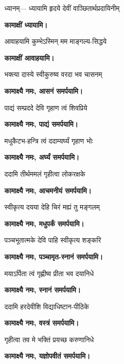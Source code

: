\needspace{0.2\textheight}
\renewcommand{\devAya}{कामाक्ष्यै नमः,}
\medskip
\begin{center}
ध्यानम्— 
{ध्यायामि हृदये देवीं वाञ्छितार्थप्रदायिनीम्}

\textbf{कामाक्षीं ध्यायामि।}

{आवाहयामि कुम्भेऽस्मिन् मम माङ्गल्य-सिद्धये}

\textbf{कामाक्षीं आवाहयामि।}

{भक्त्या दास्ये स्वीकुरुष्व वरदा भव चासनम्}

\textbf{\devAya{} आसनं समर्पयामि।}
\medskip

{पाद्यं सम्प्रददे देवि गृहाण त्वं शिवप्रिये}

\textbf{\devAya{} पाद्यं समर्पयामि।}
\medskip

{मधुकैटभ-हन्त्रि त्वं ददाम्यर्घ्यं गृहाण भोः}

\textbf{\devAya{} अर्घ्यं समर्पयामि।}
\medskip

{ददामि तीर्थममलं गृहीत्वा लोकरक्षके}

\textbf{\devAya{} आचमनीयं समर्पयामि।}
\medskip

{स्वीकृत्य दयया देहि चिरं मह्यं तु मङ्गलम्}

\textbf{\devAya{} मधुपर्कं समर्पयामि।}
\medskip

{पञ्चभूतात्मके देवि पाहि स्वीकृत्य शङ्करि}

\textbf{\devAya{} पञ्चामृत-स्नानं समर्पयामि।}
\medskip

{मयाऽर्पिता त्वं गृह्णीष्व प्रीता भव दयानिधे}

\textbf{\devAya{} स्नानं समर्पयामि।}
\medskip

{ददामि हरदेवीशि विद्याधिष्टान-पीठिके}

\textbf{\devAya{} वस्त्रं समर्पयामि।}
\medskip

{गृहीत्वा तव मे भक्तिं प्रयच्छ करुणानिधे}

\textbf{\devAya{} यज्ञोपवीतं समर्पयामि।}
\medskip


\end{center}
